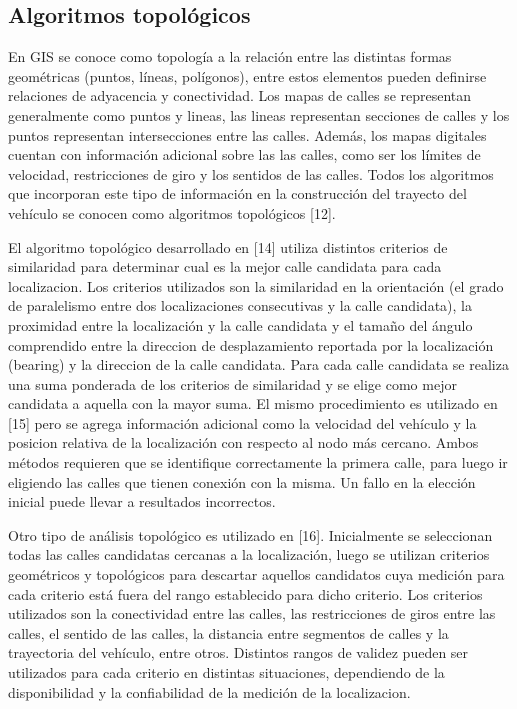 \documentclass[final,fmstyle]{fpunathesis}
\begin{document}
\subsection{Algoritmos topológicos}

En GIS se conoce como topología a la relación entre las distintas formas geométricas (puntos, líneas, polígonos), entre estos elementos pueden definirse relaciones de adyacencia y conectividad. Los mapas de calles se representan generalmente como puntos y lineas, las lineas representan secciones de calles y los puntos representan intersecciones entre las calles. Además, los mapas digitales cuentan con información adicional sobre las las calles, como ser los límites de velocidad, restricciones de giro y los sentidos de las calles. Todos los algoritmos que incorporan este tipo de información en la construcción del trayecto del vehículo se conocen como algoritmos topológicos [12].

El algoritmo topológico desarrollado en [14] utiliza distintos criterios de similaridad para determinar cual es la mejor calle candidata para cada localizacion. Los criterios utilizados son la similaridad en la orientación (el grado de paralelismo entre dos localizaciones consecutivas y la calle candidata), la proximidad entre la localización y la calle candidata y el tamaño del ángulo comprendido entre la direccion de desplazamiento reportada por la localización (bearing) y la direccion de la calle candidata. Para cada calle candidata se realiza una suma ponderada de los criterios de similaridad y se elige como mejor candidata a aquella con la mayor suma. El mismo procedimiento es utilizado en [15] pero se agrega información adicional como la velocidad del vehículo y la posicion relativa de la localización con respecto al nodo más cercano. Ambos métodos requieren que se identifique correctamente la primera calle, para luego ir eligiendo las calles que tienen conexión con la misma. Un fallo en la elección inicial puede llevar a resultados incorrectos.

Otro tipo de análisis topológico es utilizado en [16]. Inicialmente se seleccionan todas las calles candidatas cercanas a la localización, luego se utilizan criterios geométricos y topológicos para descartar aquellos candidatos cuya medición para cada criterio está fuera del rango establecido para dicho criterio. Los criterios utilizados son la conectividad entre las calles, las restricciones de giros entre las calles, el sentido de las calles, la distancia entre segmentos de calles y la trayectoria del vehículo, entre otros. Distintos rangos de validez pueden ser utilizados para cada criterio en distintas situaciones, dependiendo de la disponibilidad y la confiabilidad de la medición de la localizacion.
\end{document}
